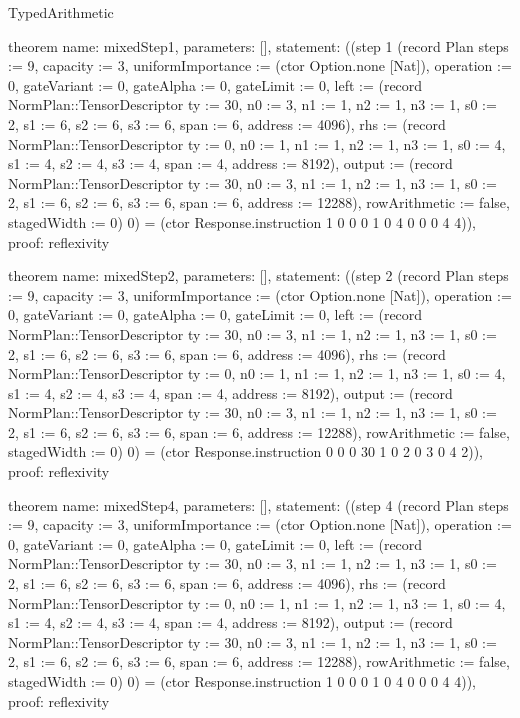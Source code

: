 \begin{lexlean}{TypedArithmetic}
\begin{semanticmodule}
theorem{
  name: mixedStep1,
  parameters: [],
  statement: ((step 1 (record Plan {steps := 9, capacity := 3, uniformImportance := (ctor Option.none [Nat]), operation := 0, gateVariant := 0, gateAlpha := 0, gateLimit := 0, left := (record NormPlan::TensorDescriptor {ty := 30, n0 := 3, n1 := 1, n2 := 1, n3 := 1, s0 := 2, s1 := 6, s2 := 6, s3 := 6, span := 6, address := 4096}), rhs := (record NormPlan::TensorDescriptor {ty := 0, n0 := 1, n1 := 1, n2 := 1, n3 := 1, s0 := 4, s1 := 4, s2 := 4, s3 := 4, span := 4, address := 8192}), output := (record NormPlan::TensorDescriptor {ty := 30, n0 := 3, n1 := 1, n2 := 1, n3 := 1, s0 := 2, s1 := 6, s2 := 6, s3 := 6, span := 6, address := 12288}), rowArithmetic := false, stagedWidth := 0}) 0) = (ctor Response.instruction 1 0 0 0 1 0 4 0 0 0 4 4)),
  proof: reflexivity{}
}

theorem{
  name: mixedStep2,
  parameters: [],
  statement: ((step 2 (record Plan {steps := 9, capacity := 3, uniformImportance := (ctor Option.none [Nat]), operation := 0, gateVariant := 0, gateAlpha := 0, gateLimit := 0, left := (record NormPlan::TensorDescriptor {ty := 30, n0 := 3, n1 := 1, n2 := 1, n3 := 1, s0 := 2, s1 := 6, s2 := 6, s3 := 6, span := 6, address := 4096}), rhs := (record NormPlan::TensorDescriptor {ty := 0, n0 := 1, n1 := 1, n2 := 1, n3 := 1, s0 := 4, s1 := 4, s2 := 4, s3 := 4, span := 4, address := 8192}), output := (record NormPlan::TensorDescriptor {ty := 30, n0 := 3, n1 := 1, n2 := 1, n3 := 1, s0 := 2, s1 := 6, s2 := 6, s3 := 6, span := 6, address := 12288}), rowArithmetic := false, stagedWidth := 0}) 0) = (ctor Response.instruction 0 0 0 30 1 0 2 0 3 0 4 2)),
  proof: reflexivity{}
}

theorem{
  name: mixedStep4,
  parameters: [],
  statement: ((step 4 (record Plan {steps := 9, capacity := 3, uniformImportance := (ctor Option.none [Nat]), operation := 0, gateVariant := 0, gateAlpha := 0, gateLimit := 0, left := (record NormPlan::TensorDescriptor {ty := 30, n0 := 3, n1 := 1, n2 := 1, n3 := 1, s0 := 2, s1 := 6, s2 := 6, s3 := 6, span := 6, address := 4096}), rhs := (record NormPlan::TensorDescriptor {ty := 0, n0 := 1, n1 := 1, n2 := 1, n3 := 1, s0 := 4, s1 := 4, s2 := 4, s3 := 4, span := 4, address := 8192}), output := (record NormPlan::TensorDescriptor {ty := 30, n0 := 3, n1 := 1, n2 := 1, n3 := 1, s0 := 2, s1 := 6, s2 := 6, s3 := 6, span := 6, address := 12288}), rowArithmetic := false, stagedWidth := 0}) 0) = (ctor Response.instruction 1 0 0 0 1 0 4 0 0 0 4 4)),
  proof: reflexivity{}
}


\end{semanticmodule}
\end{lexlean}
